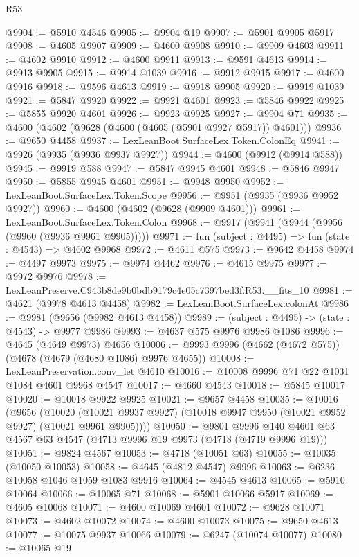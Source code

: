 \begin{lexlean}{R53}
\begin{coremodule}
@9904 := @5910 @4546
@9905 := @9904 @19
@9907 := @5901 @9905 @5917
@9908 := @4605 @9907
@9909 := @4600 @9908
@9910 := @9909 @4603
@9911 := @4602 @9910
@9912 := @4600 @9911
@9913 := @9591 @4613
@9914 := @9913 @9905
@9915 := @9914 @1039
@9916 := @9912 @9915
@9917 := @4600 @9916
@9918 := @9596 @4613
@9919 := @9918 @9905
@9920 := @9919 @1039
@9921 := @5847 @9920
@9922 := @9921 @4601
@9923 := @5846 @9922
@9925 := @5855 @9920 @4601
@9926 := @9923 @9925
@9927 := @9904 @71
@9935 := @4600 (@4602 (@9628 (@4600 (@4605 (@5901 @9927 @5917)) @4601)))
@9936 := @9650 @4458
@9937 := LexLeanBoot.SurfaceLex.Token.ColonEq
@9941 := @9926 (@9935 (@9936 @9937 @9927))
@9944 := @4600 (@9912 (@9914 @588))
@9945 := @9919 @588
@9947 := @5847 @9945 @4601
@9948 := @5846 @9947
@9950 := @5855 @9945 @4601
@9951 := @9948 @9950
@9952 := LexLeanBoot.SurfaceLex.Token.Scope
@9956 := @9951 (@9935 (@9936 @9952 @9927))
@9960 := @4600 (@4602 (@9628 (@9909 @4601)))
@9961 := LexLeanBoot.SurfaceLex.Token.Colon
@9968 := @9917 (@9941 (@9944 (@9956 (@9960 (@9936 @9961 @9905)))))
@9971 := fun (subject : @4495) => fun (state : @4543) => @4602 @9968
@9972 := @4611 @575
@9973 := @9642 @4458
@9974 := @4497 @9973
@9975 := @9974 @4462
@9976 := @4615 @9975
@9977 := @9972 @9976
@9978 := LexLeanPreserve.C943b8de9b0bdb9179c4e05c7397bed3f.R53.__fits_10
@9981 := @4621 (@9978 @4613 @4458)
@9982 := LexLeanBoot.SurfaceLex.colonAt
@9986 := @9981 (@9656 (@9982 @4613 @4458))
@9989 := (subject : @4495) -> (state : @4543) -> @9977 @9986
@9993 := @4637 @575 @9976 @9986 @1086
@9996 := @4645 (@4649 @9973) @4656
@10006 := @9993 @9996 (@4662 (@4672 @575)) (@4678 (@4679 (@4680 @1086) @9976 @4655))
@10008 := LexLeanPreservation.conv_let @4610
@10016 := @10008 @9996 @71 @22 @1031 @1084 @4601 @9968 @4547
@10017 := @4660 @4543
@10018 := @5845 @10017
@10020 := @10018 @9922 @9925
@10021 := @9657 @4458
@10035 := @10016
    (@9656
      (@10020 (@10021 @9937 @9927) (@10018 @9947 @9950 (@10021 @9952 @9927) (@10021 @9961 @9905))))
@10050 := @9801
    @9996
    @140
    @4601
    @63
    @4567
    @63
    @4547
    (@4713 @9996 @19 @9973 (@4718 (@4719 @9996 @19)))
@10051 := @9824 @4567
@10053 := @4718 (@10051 @63)
@10055 := @10035 (@10050 @10053)
@10058 := @4645 (@4812 @4547) @9996
@10063 := @6236 @10058 @1046 @1059 @1083 @9916
@10064 := @4545 @4613
@10065 := @5910 @10064
@10066 := @10065 @71
@10068 := @5901 @10066 @5917
@10069 := @4605 @10068
@10071 := @4600 @10069 @4601
@10072 := @9628 @10071
@10073 := @4602 @10072
@10074 := @4600 @10073
@10075 := @9650 @4613
@10077 := @10075 @9937 @10066
@10079 := @6247 (@10074 @10077)
@10080 := @10065 @19

\end{coremodule}
\end{lexlean}
